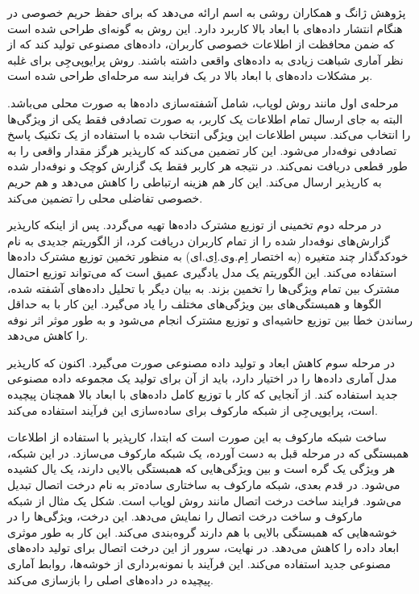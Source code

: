 
پژوهش ژانگ و همکاران  روشی به اسم  ارائه می‌دهد که برای حفظ حریم خصوصی در هنگام انتشار داده‌های با ابعاد بالا کاربرد دارد. این روش به گونه‌ای طراحی شده است که ضمن محافظت از اطلاعات خصوصی کاربران، داده‌های مصنوعی تولید کند که از نظر آماری شباهت زیادی به داده‌های واقعی داشته باشند. روش پرایو‌پی‌جِی برای غلبه بر مشکلات داده‌های با ابعاد بالا در یک فرایند سه مرحله‌ای طراحی شده است.

مرحله‌ی اول مانند روش لوپاب، شامل آشفته‌سازی داده‌ها به صورت محلی می‌باشد. البته به جای ارسال تمام اطلاعات یک کاربر، به صورت تصادفی فقط یکی از ویژگی‌ها را انتخاب می‌کند. سپس اطلاعات این ویژگی انتخاب شده با استفاده از یک تکنیک پاسخ تصادفی نوفه‌دار می‌شود. این کار تضمین می‌کند که کارپذیر هرگز مقدار واقعی را به طور قطعی دریافت نمی‌کند. در نتیجه هر کاربر فقط یک گزارش کوچک و نوفه‌دار شده به کارپذیر ارسال می‌کند. این کار هم هزینه ارتباطی را کاهش می‌دهد و هم حریم خصوصی تفاضلی محلی را تضمین می‌کند.

در مرحله دوم تخمینی از توزیع مشترک داده‌ها تهیه می‌گردد.  پس از اینکه کارپذیر گزارش‌های نوفه‌دار شده را از تمام کاربران دریافت کرد، از الگوریتم جدیدی به نام خودکدگذار چند متغیره (به اختصار اِم.وی.اِی.ای) به منظور تخمین توزیع مشترک داده‌ها استفاده می‌کند. این الگوریتم یک مدل یادگیری عمیق است که می‌تواند توزیع احتمال مشترک بین تمام ویژگی‌ها را تخمین بزند. به بیان دیگر با تحلیل داده‌های آشفته شده، الگوها و همبستگی‌های بین ویژگی‌های مختلف را یاد می‌گیرد. این کار با به حداقل رساندن خطا بین توزیع حاشیه‌ای و توزیع مشترک انجام می‌شود و به طور موثر اثر نوفه را کاهش می‌دهد.

در مرحله سوم کاهش ابعاد و تولید داده مصنوعی صورت می‌گیرد. اکنون که کارپذیر مدل آماری داده‌ها را در اختیار دارد، باید از آن برای تولید یک مجموعه داده مصنوعی جدید استفاده کند. از آنجایی که کار با توزیع کامل داده‌های با ابعاد بالا همچنان پیچیده است، پرایو‌پی‌جِی از شبکه مارکوف برای ساده‌سازی این فرآیند استفاده می‌کند.

ساخت شبکه مارکوف به این صورت است که  ابتدا، کارپذیر با استفاده از اطلاعات همبستگی که در مرحله قبل به دست آورده، یک شبکه مارکوف می‌سازد. در این شبکه، هر ویژگی یک گره است و بین ویژگی‌هایی که همبستگی بالایی دارند، یک یال کشیده می‌شود. در قدم بعدی، شبکه مارکوف به ساختاری ساده‌تر به نام درخت اتصال تبدیل می‌شود. فرایند ساخت درخت اتصال مانند روش لوپاب است. شکل  یک مثال از شبکه مارکوف و ساخت درخت اتصال را نمایش می‌دهد. این درخت، ویژگی‌ها را در خوشه‌هایی که همبستگی بالایی با هم دارند گروه‌بندی می‌کند. این کار به طور موثری ابعاد داده را کاهش می‌دهد. در نهایت، سرور از این درخت اتصال برای تولید داده‌های مصنوعی جدید استفاده می‌کند. این فرآیند با نمونه‌برداری از خوشه‌ها، روابط آماری پیچیده در داده‌های اصلی را بازسازی می‌کند.

